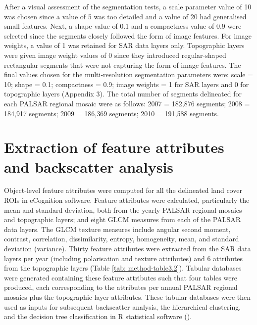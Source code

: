 After a visual assessment of the segmentation tests, a scale parameter value of 10 was chosen since a value of 5 was too detailed and a value of 20 had generalised small features. Next, a shape value of 0.1 and a compactness value of 0.9 were selected since the segments closely followed the form of image features. For image weights, a value of 1 was retained for SAR data layers only. Topographic layers were given image weight values of 0 since they introduced regular-shaped rectangular segments that were not capturing the form of image features. The final values chosen for the multi-resolution segmentation parameters were: scale = 10; shape = 0.1; compactness = 0.9; image weights = 1 for SAR layers and 0 for topographic layers (Appendix 3). The total number of segments delineated for each PALSAR regional mosaic were as follows: 2007 = 182,876 segments; 2008 = 184,917 segments; 2009 = 186,369 segments; 2010 = 191,588 segments.

\section{Extraction of feature attributes and backscatter analysis}
\label{sec: method-feature-extraction}

Object-level feature attributes were computed for all the delineated land cover ROIs in eCognition software. Feature attributes were calculated, particularly the mean and standard deviation, both from the yearly PALSAR regional mosaics and topographic layers; and eight GLCM measures from each of the PALSAR data layers. The GLCM texture measures include angular second moment, contrast, correlation, dissimilarity, entropy, homogeneity, mean, and standard deviation (variance). Thirty feature attributes were extracted from the SAR data layers per year (including polarisation and texture attributes) and 6 attributes from the topographic layers (Table \ref{tab: method-table3.2}). Tabular databases were generated containing these feature attributes such that four tables were produced, each corresponding to the attributes per annual PALSAR regional mosaics plus the topographic layer attributes. These tabular databases were then used as inputs for subsequent backscatter analysis, the hierarchical clustering, and the decision tree classification in R statistical software (\cite{r_core_team_r:_2016}).\\


